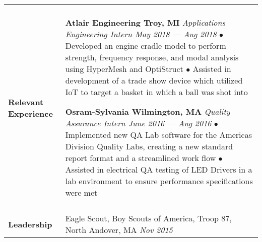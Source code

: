 \documentclass[12pt]{article}
\begin{document}
\begin{table}[H]
\begin{tabularx}{\textwidth}{@{}X p{6.25in} @{}}
		 & \\

		\textbf{Relevant Experience} & 
		\textbf{Atlair Engineering \hfill Troy, MI} \newline \textit{Applications Engineering Intern \hfill May 2018 --- Aug 2018} \newpage {\small$\bullet$ 
		Developed an engine cradle model to perform strength, frequency response, and modal analysis using HyperMesh and OptiStruct\newline $\bullet$ 
		Assisted in development of a trade show device which utilized IoT to target a basket in which a ball was shot into}
		
		\textbf{Osram-Sylvania \hfill Wilmington, MA} \newline \textit{Quality Assurance Intern \hfill June 2016 --- Aug 2016} \newpage {\small$\bullet$ 
		Implemented new QA Lab software for the Americas Division Quality Labs, creating a new standard report format and a streamlined work flow\newline $\bullet$ 
		Assisted in electrical QA testing of LED Drivers in a lab environment to ensure performance specifications were met}\\

		 & \\



		\textbf{Leadership} & Eagle Scout, Boy Scouts of America, Troop 87, North Andover, MA \hfill \textit{Nov 2015}
		\\


\end{tabularx}
\end{table}
\end{document}
